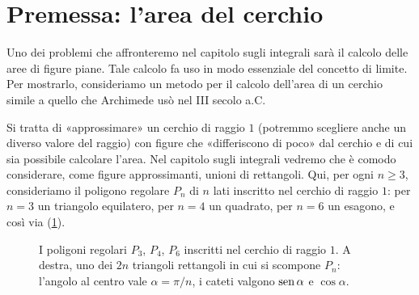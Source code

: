 \section{Premessa: l'area del cerchio}
\label{sec:premessa-limiti}

Uno dei problemi che affronteremo nel capitolo sugli integrali sarà il calcolo delle
aree di figure piane. Tale calcolo fa uso in modo essenziale del concetto di limite. Per
mostrarlo, consideriamo un metodo per il calcolo dell'area di un cerchio simile a quello
che Archimede usò nel III secolo a.C.

Si tratta di «approssimare» un cerchio di raggio $1$ (potremmo scegliere anche un
diverso valore del raggio) con figure che «differiscono di poco» dal cerchio e di cui sia
possibile calcolare l'area. Nel capitolo sugli integrali vedremo che è comodo
considerare, come figure approssimanti, unioni di rettangoli. Qui, per ogni $n\ge3$,
consideriamo il poligono regolare $P_{n}$ di $n$ lati inscritto nel cerchio di raggio
$1$: per $n=3$ un triangolo equilatero, per $n=4$ un quadrato, per $n=6$ un esagono, e
così via (\cref{fig:poligoni-inscritti}).

\begin{figure}[htb]
\centering
{}
\caption{I poligoni regolari $P_{3}$, $P_{4}$, $P_{6}$ inscritti nel cerchio di raggio
$1$. A destra, uno dei $2n$ triangoli rettangoli in cui si scompone $P_{n}$: l'angolo al
centro vale $\alpha=\pi/n$, i cateti valgono $\operatorname{sen}\alpha$ e $\cos\alpha$.}
\label{fig:poligoni-inscritti}
\end{figure}

